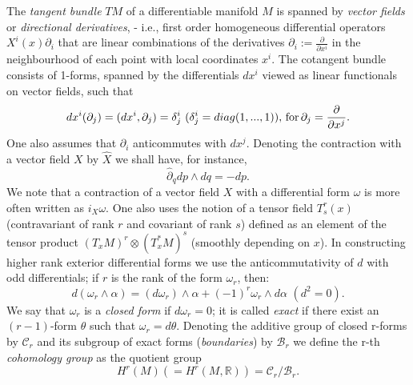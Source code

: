 The {\it tangent bundle} $TM$ of a differentiable manifold $M$ is spanned by
{\it vector fields} or {\it directional derivatives}, - i.e., first order
homogeneous differential operators $X^i(x)\partial_i$ that are linear
combinations of the derivatives $\partial_i:= \frac{\partial}{\partial x^i}$ in
 the neighbourhood of each point with local coordinates $x^i$. The cotangent
bundle consists of 1-forms, spanned by the differentials $dx^i$ viewed as
linear functionals on vector fields, such that
\begin{equation}
\label{dx}
dx^i(\partial_j) = (dx^i, \partial_j) = \delta^i_j \, \, (\delta^i_j =
diag(1, ..., 1)), \, {\rm for} \, \partial_j = \frac{\partial}{\partial x^j}.
\end{equation}
One also assumes that $\partial_i$ anticommutes with $dx^j$. Denoting the
contraction with a vector field $X$ by ${\hat X}$ we shall have, for instance,
\begin{equation}
{\hat \partial}_q dp\wedge dq = - dp.
\end{equation}
We note that a contraction of a vector field $X$ with a differential form
$\omega$ is more often written as $i_X \omega$. One also uses the notion of a
tensor field $T^r_s(x)$ (contravariant of rank $r$ and covariant of rank $s$)
defined as an element of the tensor product $(T_x M)^r\otimes(T^*_x M)^s$
(smoothly depending on $x$). In constructing higher rank exterior differential
forms we use the anticommutativity of $d$ with odd differentials; if $r$ is the
rank of the form $\omega_r$, then:
\begin{equation}
\label{d^2}
d(\omega_r\wedge\alpha) = (d\omega_r)\wedge\alpha + (-1)^r\omega_r \wedge d\alpha \, \, (d^2 = 0).
\end{equation}
We say that $\omega_r$ is a {\it closed form} if $d\omega_r = 0$; it is called
{\it exact} if there exist an $(r-1)$-form $\theta$ such that $\omega_r = d\theta$.
Denoting the additive group of closed r-forms by ${\mathcal C}_r$ and its subgroup of
exact forms ({\it boundaries}) by ${\mathcal B}_r$ we define the r-th {\it cohomology
group} as the quotient group
\begin{equation}
\label{Hr}
H^r(M) (=H^r(M, {\mathbb R})) = {\mathcal C}_r /{\mathcal B}_r.
\end{equation}

